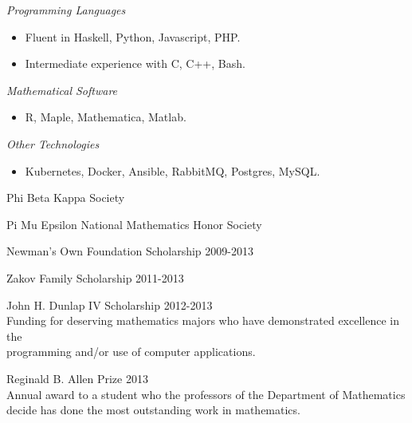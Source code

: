 \documentclass[11pt,article,oneside]{memoir}
\begin{document}




\ind \emph{Programming Languages}
\small
\begin{itemize}
  \item Fluent in Haskell, Python, Javascript, PHP.
  \item Intermediate experience with C, C++, Bash.
\end{itemize}
\normalsize

\ind \emph{Mathematical Software}
\small
\begin{itemize}
  \item R, Maple, Mathematica, Matlab.
\end{itemize}
\normalsize

\ind \emph{Other Technologies}
\small
\begin{itemize}
  \item Kubernetes, Docker, Ansible, RabbitMQ, Postgres, MySQL.
\end{itemize}
\normalsize

\bigskip


\ind Phi Beta Kappa Society

\ind Pi Mu Epsilon National Mathematics Honor Society

\ind Newman's Own Foundation Scholarship \hfill {\small 2009-2013}

\ind Zakov Family Scholarship \hfill {\small 2011-2013}

\ind John H. Dunlap IV Scholarship \hfill {\small 2012-2013} \\
\footnotesize
  Funding for deserving mathematics majors who have demonstrated excellence in
  the \\ programming and/or use of computer applications.
\normalsize

\ind Reginald B. Allen Prize \hfill {\small 2013} \\
\footnotesize
  Annual award to a student who the professors of the Department of
  Mathematics decide has done the most outstanding work in mathematics.
\normalsize
\end{document}
